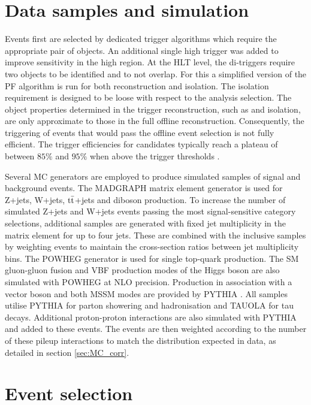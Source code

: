 \section{Data samples and simulation}
\label{sec:analysis_samples}

Events first are selected by dedicated trigger algorithms which require the appropriate pair of \tauh objects. An additional single high \pt \tauh trigger was added to improve sensitivity in the high \pt region. At the HLT level, the di-\tauh triggers require two \tauh objects to be identified and to not overlap. For this a simplified version of the PF algorithm is run for both \tauh reconstruction and isolation. The isolation requirement is designed to be loose with respect to the analysis selection. The object properties determined in the trigger reconstruction, such as \pt and isolation, are only approximate to those in the full offline reconstruction. Consequently, the triggering of events that would pass the offline event selection is not fully efficient. The trigger efficiencies for \tauh candidates typically reach a plateau of between $85\%$ and $95\%$ when above the trigger \pt thresholds \cite{Sirunyan_2018}.

Several MC generators are employed to produce simulated samples of signal and background events. The MADGRAPH \cite{Alwall2011} matrix element generator is used for Z+jets, W+jets, $\mathrm{t\Bar{t}}$+jets and diboson production. To increase the number of simulated Z+jets and W+jets events passing the most signal-sensitive category selections, additional samples are generated with fixed jet multiplicity in the matrix element for up to four jets. These are combined with the inclusive samples by weighting events to maintain the cross-section ratios between jet multiplicity bins. The POWHEG \cite{Alioli2010} generator is used for single top-quark production. The SM gluon-gluon fusion and VBF production modes of the Higgs boson are also simulated with POWHEG at NLO precision. Production in association with a vector boson and both MSSM modes are provided by PYTHIA \cite{SJOSTRAND2008852}. All samples utilise PYTHIA for parton showering and hadronisation and TAUOLA \cite{JADACH1991275} for tau decays. Additional proton-proton interactions are also simulated with PYTHIA and added to these events. The events are then weighted according to the number of these pileup interactions to match the distribution expected in data, as detailed in section \ref{sec:MC_corr}.

\section{Event selection}
\label{sec:analysis_eventsel}


